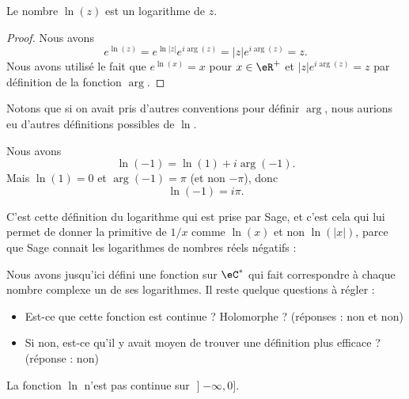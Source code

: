 \begin{lemma}
    Le nombre \( \ln(z)\) est un logarithme de \( z\).
\end{lemma}

\begin{proof}
    Nous avons
    \begin{equation}
        e^{\ln(z)}= e^{\ln| z |} e^{i\arg(z)}=| z | e^{i\arg(z)}=z.
    \end{equation}
    Nous avons utilisé le fait que \(  e^{\ln(x)}=x\) pour \( x\in\eR^+\) et \( | z | e^{i\arg(z)}=z\) par définition de la fonction \( \arg\).
\end{proof}

Notons que si on avait pris d'autres conventions pour définir \( \arg\), nous aurions eu d'autres définitions possibles de \( \ln\).

\begin{example}
    Nous avons
    \begin{equation}
        \ln(-1)=\ln(1)+i\arg(-1).
    \end{equation}
    Mais \( \ln(1)=0\) et \( \arg(-1)=\pi\) (et non \( -\pi\)), donc 
    \begin{equation}
        \ln(-1)=i\pi.
    \end{equation}

    C'est cette définition du logarithme qui est prise par Sage, et c'est cela qui lui permet de donner la primitive de \( 1/x\) comme \( \ln(x)\) et non \( \ln(| x |)\), parce que Sage connait les logarithmes de nombres réels négatifs :

\end{example}

Nous avons jusqu'ici défini une fonction sur \( \eC^*\) qui fait correspondre à chaque nombre complexe un de ses logarithmes. Il reste quelque questions à régler :
\begin{itemize}
    \item Est-ce que cette fonction est continue ? Holomorphe ? (réponses : non et non)
    \item Si non, est-ce qu'il y avait moyen de trouver une définition plus efficace ? (réponse : non)
\end{itemize}

\begin{lemma}
La fonction \( \ln\) n'est pas continue sur \( \mathopen] -\infty , 0 \mathclose]\).
\end{lemma}

